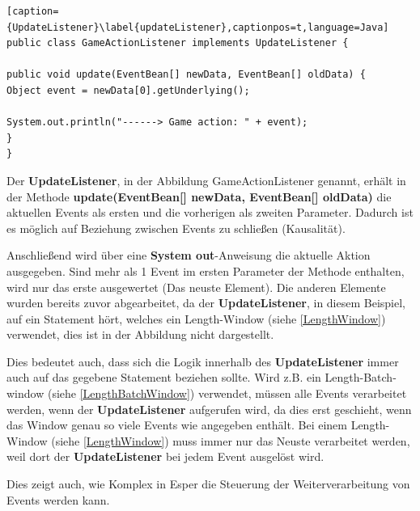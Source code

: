 \begin{lstlisting}[caption={UpdateListener}\label{updateListener},captionpos=t,language=Java]
public class GameActionListener implements UpdateListener {

public void update(EventBean[] newData, EventBean[] oldData) {
Object event = newData[0].getUnderlying();

System.out.println("------> Game action: " + event);
}
}
\end{lstlisting}

Der \textbf{UpdateListener}, in der Abbildung GameActionListener genannt, erhält in der Methode \textbf{update(EventBean[] newData, EventBean[] oldData)} die aktuellen Events als ersten und die vorherigen als zweiten Parameter. Dadurch ist es möglich auf Beziehung zwischen Events zu schließen (Kausalität).

Anschließend wird über eine \textbf{System out}-Anweisung die aktuelle Aktion ausgegeben. Sind mehr als 1 Event im ersten Parameter der Methode enthalten, wird nur das erste ausgewertet (Das neuste Element). Die anderen Elemente wurden bereits zuvor abgearbeitet, da der \textbf{UpdateListener}, in diesem Beispiel, auf ein Statement hört, welches ein Length-Window (siehe \ref{LengthWindow}) verwendet, dies ist in der Abbildung nicht dargestellt.

Dies bedeutet auch, dass sich die Logik innerhalb des \textbf{UpdateListener} immer auch auf das gegebene Statement beziehen sollte. Wird z.B. ein Length-Batch-window (siehe \ref{LengthBatchWindow}) verwendet, müssen alle Events verarbeitet werden, wenn der \textbf{UpdateListener} aufgerufen wird, da dies erst geschieht, wenn das Window genau so viele Events wie angegeben enthält. Bei einem Length-Window (siehe \ref{LengthWindow}) muss immer nur das Neuste verarbeitet werden, weil dort der \textbf{UpdateListener} bei jedem Event ausgelöst wird. 

Dies zeigt auch, wie Komplex in Esper die Steuerung der Weiterverarbeitung von Events werden kann. 